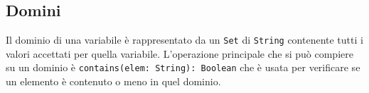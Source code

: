 \subsection{Domini}
Il dominio di una variabile è rappresentato da un \texttt{Set} di \texttt{String} contenente tutti i valori accettati per quella variabile.
L'operazione principale che si può compiere su un dominio è \texttt{contains(elem: String): Boolean} che è usata per verificare se un elemento è contenuto o meno in quel dominio.